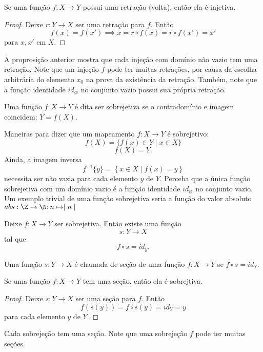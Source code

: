          \begin{stat}
            Se uma função $f: X \to Y$ possui uma retração (volta), então ela é injetiva.
         \end{stat}
         \begin{proof}
            Deixe $r: Y \to X$ ser uma retração para $f$. Então $$f(x) = f(x') \implies x=r\circ f(x) = r\circ f(x') = x'$$ para $x,x'$ em $X$.
         \end{proof}
         A proprosição anterior mostra que cada injeção com domínio não vazio tem uma retração. Note que um injeção $f$ pode ter muitas retrações, por causa da escolha arbitrária do elemento $x_{0}$ na prova da existência da retração. Também, note que a função identidade $id_{\varnothing}$ no conjunto vazio possui sua própria retração.
         \begin{definition}
            Uma função $f: X \to Y$ é dita ser sobrejetiva se o contradomínio e imagem coincidem: $Y = f(X)$.
         \end{definition}
         Maneiras para dizer que um mapeamento $f: X \to Y$ é sobrejetivo:
         $$f(X) = \{f(x) \in Y \mid x \in X\}$$
         $$f(X) = Y.$$
         Ainda, a imagem inversa $$f^{-1}\{y\} = \left\{x \in X \mid f(x) = y\right\}$$ necessita ser não vazia para cada elemento $y$ de $Y$. Perceba que a única função sobrejetiva com um domínio vazio é a função identidade $id_{\varnothing}$ no conjunto vazio.
         Um exemplo trivial de uma função sobrejetiva seria a função do valor absoluto $abs: \Z \to \N; n \mapsto \mid n \mid$
         \begin{stat}
            Deixe $f: X \to Y$ ser sobrejetiva. Então existe uma função $$s: Y \to X$$ tal que $$f \circ s = id_{y}.$$
         \end{stat}
         \begin{definition}[Seções]
            Uma função $s: Y \to X$ é chamada de seção de uma função $f: X \to Y$ se $f \circ s = id_{Y}.$
         \end{definition}
         \begin{stat}
            Se uma função $f: X \to Y$ tem uma seção, então ela é sobrejtiva.
            \begin{proof}
               Deixe $s: Y\to X$ ser uma seção para $f$. Então $$f\left(s(y)\right) = f\circ s(y) = id_{Y} = y$$
               para cada elemento $y$ de $Y$.
            \end{proof}
         \end{stat}
         Cada sobrejeção tem uma seção. Note que uma sobrejeção $f$ pode ter muitas seções.

